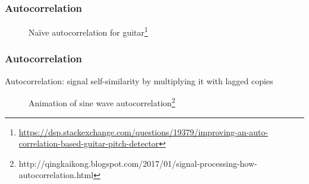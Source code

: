 \documentclass{beamer}
\begin{document}

\begin{frame}
	\frametitle{Autocorrelation}
	\begin{figure}
		\hspace{0.1em}
		\caption{Na{\"i}ve autocorrelation for guitar\footnote{\href{https://dsp.stackexchange.com/questions/19379/improving-an-auto-correlation-based-guitar-pitch-detector}{https://dsp.stackexchange.com/questions/19379/improving-an-auto-correlation-based-guitar-pitch-detector}}}
	\end{figure}
\end{frame}

\begin{frame}
	\frametitle{Autocorrelation}
	Autocorrelation: signal self-similarity by multiplying it with lagged copies
	\begin{figure}
		\caption{Animation of sine wave autocorrelation\footnote{http://qingkaikong.blogspot.com/2017/01/signal-processing-how-autocorrelation.html}}
		\vspace{-1em}
	\end{figure}
\end{frame}

\end{document}
